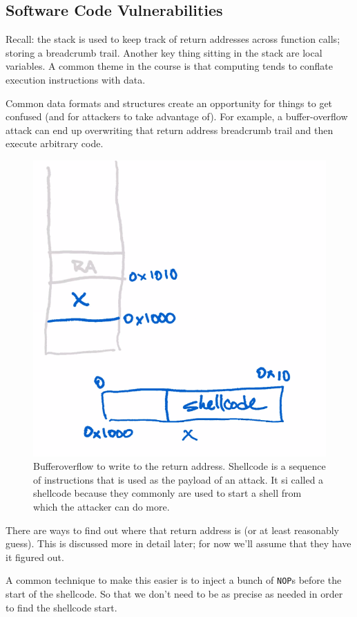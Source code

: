 \documentclass[../notes.tex]{subfiles}
\begin{document}
\subsection{Software Code Vulnerabilities}


Recall: the stack is used to keep track of return addresses across function calls; storing a breadcrumb trail.
Another key thing sitting in the stack are local variables. 
A common theme in the course is that computing tends to conflate execution instructions with data.

Common data formats and structures create an opportunity for things to get confused (and for attackers to take advantage of). 
For example, a buffer-overflow attack can end up overwriting that return address breadcrumb trail and then execute arbitrary code.

\begin{figure}[H]
    \centering
    \includegraphics[width=0.8\linewidth]{img/image_2023-01-16-18-27-59.png}
    \caption{Bufferoverflow to write to the return address. Shellcode is a sequence of instructions that is used as the payload of an attack. It si called a shellcode because they commonly are used to start a shell from which the attacker can do more.}
\end{figure}


There are ways to find out where that return address is (or at least reasonably guess).
This is discussed more in detail later; for now we'll assume that they have it figured out.


A common technique to make this easier is to inject a bunch of \texttt{NOP}s before the start of the shellcode. So that we don't need to be as precise as needed in order to find the shellcode start.
\end{document}
